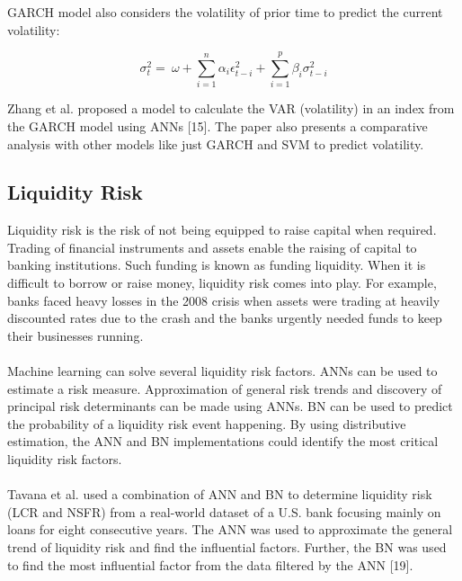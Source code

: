 \documentclass[a4paper, 12pt]{article}
\begin{document}
\noindent GARCH model also considers the volatility of prior time to predict the current volatility:

\begin{equation}
    \sigma_t^2 = \ \omega + \sum_{i = 1}^{n} \alpha_i \epsilon_{t - i}^2 + \sum_{i = 1}^{p} \beta_i \sigma_{t - i}^2
\end{equation}

\noindent Zhang et al. proposed a model to calculate the VAR (volatility) in an index from the GARCH model using ANNs [15]. The paper also presents a comparative analysis with other models like just GARCH and SVM to predict volatility.

\vskip 0.2in
\subsection{Liquidity Risk}
\noindent Liquidity risk is the risk of not being equipped to raise capital when required. Trading of financial instruments and assets enable the raising of capital to banking institutions. Such funding is known as funding liquidity. When it is difficult to borrow or raise money, liquidity risk comes into play. For example, banks faced heavy losses in the 2008 crisis when assets were trading at heavily discounted rates due to the crash and the banks urgently needed funds to keep their businesses running.
\\
\\
\noindent Machine learning can solve several liquidity risk factors. ANNs can be used to estimate a risk measure. Approximation of general risk trends and discovery of principal risk determinants can be made using ANNs. BN can be used to predict the probability of a liquidity risk event happening.  By using distributive estimation, the ANN and BN implementations could identify the most critical liquidity risk factors.
\\
\\
\noindent Tavana et al. used a combination of ANN and BN to determine liquidity risk (LCR and NSFR) from a real-world dataset of a U.S. bank focusing mainly on loans for eight consecutive years. The ANN was used to approximate the general trend of liquidity risk and find the influential factors. Further, the BN was used to find the most influential factor from the data filtered by the ANN [19].

\vskip 0.2in
\end{document}

